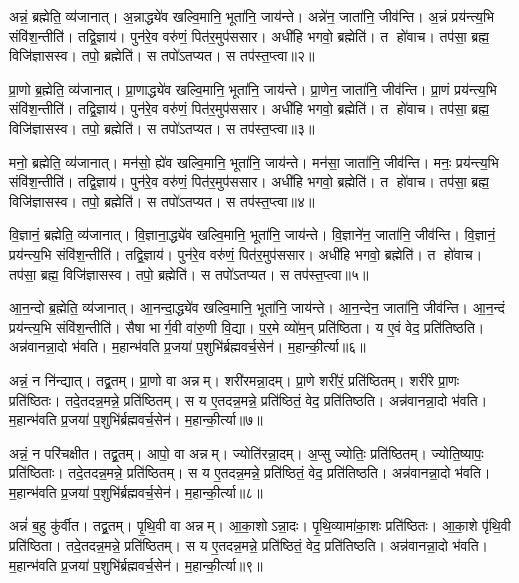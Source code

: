 अन्नं॒ ब्रह्मेति॒ व्य॑जानात्। अ॒न्नाद्ध्ये॑व खल्वि॒मानि॒ भूता॑नि॒ जाय॑न्ते। अन्ने॑न॒ जाता॑नि॒ जीव॑न्ति। अ॒न्नं प्रय॑न्त्य॒भि  संवि॑श॒न्तीति॑। तद्वि॒ज्ञाय॑। पुन॑रे॒व वरु॑णं॒ पित॑र॒मुप॑ससार। अधी॑हि भगवो॒ ब्रह्मेति॑। त हो॑वाच। तप॑सा॒ ब्रह्म॒ विजि॑ज्ञासस्व। तपो॒ ब्रह्मेति॑। स तपो॑ऽतप्यत। स तप॑स्त॒प्त्वा॥२॥

प्रा॒णो ब्र॒ह्मेति॒ व्य॑जानात्। प्रा॒णाद्ध्ये॑व खल्वि॒मानि॒ भूता॑नि॒ जाय॑न्ते। प्रा॒णेन॒ जाता॑नि॒ जीव॑न्ति। प्रा॒णं प्रय॑न्त्य॒भि  संवि॑श॒न्तीति॑। तद्वि॒ज्ञाय॑। पुन॑रे॒व वरु॑णं॒ पित॑र॒मुप॑ससार। अधी॑हि भगवो॒ ब्रह्मेति॑। त हो॑वाच। तप॑सा॒ ब्रह्म॒ विजि॑ज्ञासस्व। तपो॒ ब्रह्मेति॑। स तपो॑ऽतप्यत। स तप॑स्त॒प्त्वा॥३॥

मनो॒ ब्रह्मेति॒ व्य॑जानात्। मन॑सो॒ ह्ये॑व खल्वि॒मानि॒ भूता॑नि॒ जाय॑न्ते। मन॑सा॒ जाता॑नि॒ जीव॑न्ति। मनः॒ प्रय॑न्त्य॒भि  संवि॑श॒न्तीति॑। तद्वि॒ज्ञाय॑। पुन॑रे॒व वरु॑णं॒ पित॑र॒मुप॑ससार। अधी॑हि भगवो॒ ब्रह्मेति॑। त हो॑वाच। तप॑सा॒ ब्रह्म॒ विजि॑ज्ञासस्व। तपो॒ ब्रह्मेति॑। स तपो॑ऽतप्यत। स तप॑स्त॒प्त्वा॥४॥

वि॒ज्ञानं॒ ब्रह्मेति॒ व्य॑जानात्। वि॒ज्ञाना॒द्ध्ये॑व खल्वि॒मानि॒ भूता॑नि॒ जाय॑न्ते। वि॒ज्ञाने॑न॒ जाता॑नि॒ जीव॑न्ति। वि॒ज्ञानं॒ प्रय॑न्त्य॒भि संवि॑श॒न्तीति॑। तद्वि॒ज्ञाय॑। पुन॑रे॒व वरु॑णं॒ पित॑र॒मुप॑ससार। अधी॑हि भगवो॒ ब्रह्मेति॑। त हो॑वाच। तप॑सा॒ ब्रह्म॒ विजि॑ज्ञासस्व। तपो॒ ब्रह्मेति॑। स तपो॑ऽतप्यत। स तप॑स्त॒प्त्वा॥५॥

आ॒न॒न्दो ब्र॒ह्मेति॒ व्य॑जानात्। आ॒नन्दा॒द्ध्ये॑व खल्वि॒मानि॒ भूता॑नि॒ जाय॑न्ते। आ॒न॒न्देन॒ जाता॑नि॒ जीव॑न्ति। आ॒न॒न्दं प्रय॑न्त्य॒भि संवि॑श॒न्तीति॑। सैषा भार्ग॒वी वा॑रु॒णी वि॒द्या। प॒र॒मे व्यो॑म॒न् प्रति॑ष्ठिता। य ए॒वं वेद॒ प्रति॑तिष्ठति। अन्न॑वानन्ना॒दो भ॑वति। म॒हान्भ॑वति प्र॒जया॑ प॒शुभि॑र्ब्रह्मवर्च॒सेन॑। म॒हान्की॒र्त्या॥६॥

अन्नं॒ न नि॑न्द्यात्। तद्व्र॒तम्। प्रा॒णो वा अन्नम्। शरी॑रमन्ना॒दम्। प्रा॒णे शरी॑रं॒ प्रति॑ष्ठितम्। शरी॑रे प्रा॒णः प्रति॑ष्ठितः। तदे॒तदन्न॒मन्ने॒ प्रति॑ष्ठितम्। स य ए॒तदन्न॒मन्ने॒ प्रति॑ष्ठितं॒ वेद॒ प्रति॑तिष्ठति। अन्न॑वानन्ना॒दो भ॑वति। म॒हान्भ॑वति प्र॒जया॑ प॒शुभि॑र्ब्रह्मवर्च॒सेन॑। म॒हान्की॒र्त्या॥७॥

अन्नं॒ न परि॑चक्षीत। तद्व्र॒तम्। आपो॒ वा अन्नम्। ज्योति॑रन्ना॒दम्। अ॒प्सु ज्योतिः॒ प्रति॑ष्ठितम्। ज्योति॒ष्यापः॒ प्रति॑ष्ठिताः। तदे॒तदन्न॒मन्ने॒ प्रति॑ष्ठितम्। स य ए॒तदन्न॒मन्ने॒ प्रति॑ष्ठितं॒ वेद॒ प्रति॑तिष्ठति। अन्न॑वानन्ना॒दो भ॑वति। म॒हान्भ॑वति प्र॒जया॑ प॒शुभि॑र्ब्रह्मवर्च॒सेन॑। म॒हान्की॒र्त्या॥८॥

अन्नं॑ ब॒हु कु॑र्वीत। तद्व्र॒तम्। पृ॒थि॒वी वा अन्नम्। आ॒का॒शोऽन्ना॒दः। पृ॒थि॒व्यामा॑का॒शः प्रति॑ष्ठितः। आ॒का॒शे पृ॑थि॒वी प्रति॑ष्ठिता। तदे॒तदन्न॒मन्ने॒ प्रति॑ष्ठितम्। स य ए॒तदन्न॒मन्ने॒ प्रति॑ष्ठितं॒ वेद॒ प्रति॑तिष्ठति। अन्न॑वानन्ना॒दो भ॑वति। म॒हान्भ॑वति प्र॒जया॑ प॒शुभि॑र्ब्रह्मवर्च॒सेन॑। म॒हान्की॒र्त्या॥९॥

